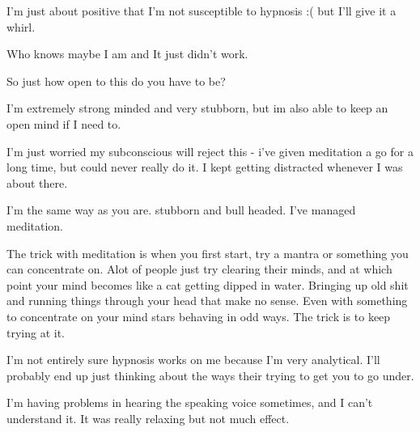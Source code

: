 \documentclass[ebook,12pt,oneside,openany]{memoir}
\begin{document}
\begin{tcolorbox}[title=Yourmomsponies]
\par{I'm just about positive that I'm not susceptible to hypnosis :(  but I'll give it a whirl. }
\par{Who knows maybe I am and It just didn't work.}
\newline{}
\newline{}
\begin{tcolorbox}[title=Creeping Dusk]
\par{So just how open to this do you have to be? }
\par{I'm extremely strong minded and very stubborn, but im also able to keep an open mind if I need to. }
\par{I'm just worried my subconscious will reject this - i've given meditation a go for a long time, but could never really do it. I kept getting distracted whenever I was about there. }
\end{tcolorbox}
\par{I'm the same way as you are. stubborn and bull headed. I've managed meditation.}
\par{The trick with meditation is when you first start, try a mantra or something you can concentrate on. Alot of people just try clearing their minds, and at which point your mind becomes like a cat getting dipped in water. Bringing up old shit and running things through your head that make no sense. Even with something to concentrate on your mind stars behaving in odd ways. The trick is to keep trying at it.}
\par{I'm not entirely sure hypnosis works on me because I'm very analytical. I'll probably end up just thinking about the ways their trying to get you to go under.}
\end{tcolorbox}
\begin{tcolorbox}[title=Kamarat]
\par{I'm having problems in hearing the speaking voice sometimes, and I can't understand it. It was really relaxing but not much effect.}
\end{tcolorbox}
\end{document}
